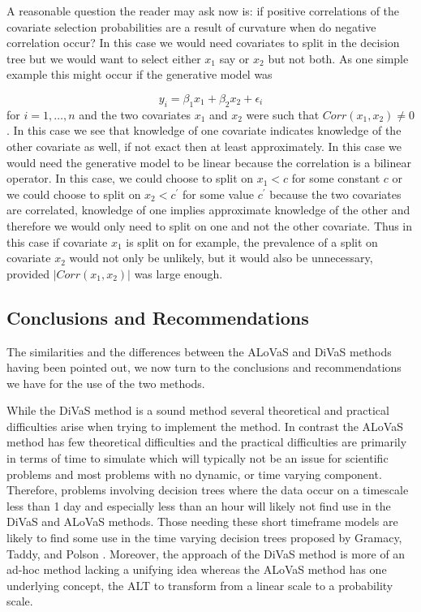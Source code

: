 A reasonable question the reader may ask now is: if positive correlations of the covariate selection probabilities are a result of curvature when do negative correlation occur? In this case we would need covariates to split in the decision tree but we would want to select either $x_1$ say or $x_2$ but not both. As one simple example this might occur if the generative model was 

\begin{equation}
y_i = \beta_1x_1 + \beta_2x_2 + \epsilon_i
\end{equation}
 for $i=1, \dots, n$ and the two covariates $x_1$ and $x_2$ were such that $Corr(x_1, x_2) \neq 0$. In this case we see that knowledge of one covariate indicates knowledge of the other covariate as well, if not exact then at least approximately.   In this case we would need the generative model to be linear because the correlation  is a bilinear operator. In this case, we could choose to split on $x_1<c$ for some constant $c$ or we could choose to split on $x_2 < c^\prime$ for some value $c^\prime$ because the two covariates are correlated, knowledge of one implies approximate knowledge of the other and therefore we would only need to split on one and not the other covariate. Thus in this case if covariate $x_1$ is split on for example, the prevalence of a split on covariate $x_2$ would not only be unlikely, but it would also be unnecessary, provided  $|Corr(x_1, x_2)|$ was large enough. 
 
\subsection{Conclusions and Recommendations}

The similarities and the differences between the ALoVaS and DiVaS methods having been pointed out, we now turn to the conclusions and recommendations we have for the use of the two methods. 

While the DiVaS method is a sound method several theoretical and practical difficulties arise when trying to implement the method. In contrast the ALoVaS method has few theoretical difficulties and the practical difficulties are primarily in terms of time to simulate which will typically not be an issue for scientific problems and most problems with no dynamic, or time varying component. Therefore, problems involving decision trees where the data occur on a timescale less than 1 day and especially less than an hour will likely not find use in the DiVaS and ALoVaS methods. Those needing these short timeframe models are likely to find some use in the time varying decision trees proposed by Gramacy, Taddy, and Polson \cite{taddy2011dynamic}. Moreover, the approach of the DiVaS method is more of an ad-hoc method lacking a unifying idea whereas the ALoVaS method has one underlying concept, the ALT to transform from a linear scale to a probability scale. 

